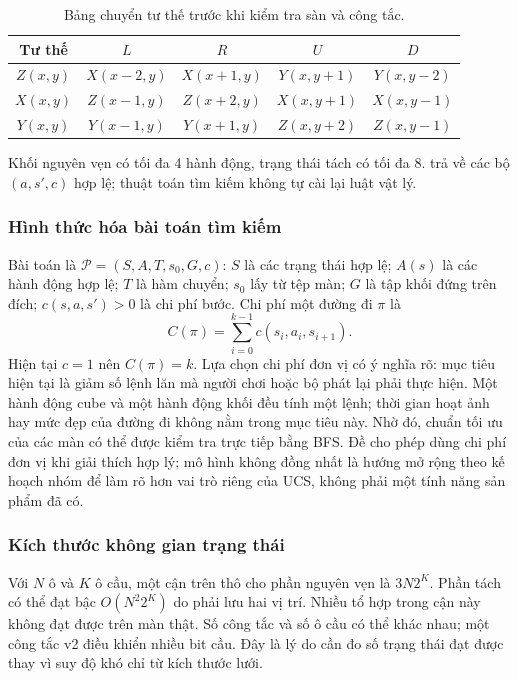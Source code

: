 \documentclass[a4paper]{article}
\newcommand{\tep}[1]{{\small\ttfamily\detokenize{#1}}}
\begin{document}
\begin{table}[H]\centering\small
\begin{tabular}{@{}c c c c c@{}}\toprule
\textbf{Tư thế} & $L$ & $R$ & $U$ & $D$\\\midrule
$Z(x,y)$ & $X(x-2,y)$ & $X(x+1,y)$ & $Y(x,y+1)$ & $Y(x,y-2)$\\
$X(x,y)$ & $Z(x-1,y)$ & $Z(x+2,y)$ & $X(x,y+1)$ & $X(x,y-1)$\\
$Y(x,y)$ & $Y(x-1,y)$ & $Y(x+1,y)$ & $Z(x,y+2)$ & $Z(x,y-1)$\\\bottomrule
\end{tabular}
\caption{Bảng chuyển tư thế trước khi kiểm tra sàn và công tắc.}
\end{table}

Khối nguyên vẹn có tối đa 4 hành động, trạng thái tách có tối đa 8. \tep{successors(state)} trả về các bộ $(a,s',c)$ hợp lệ; thuật toán tìm kiếm không tự cài lại luật vật lý.

\subsubsection{Hình thức hóa bài toán tìm kiếm}
Bài toán là $\mathcal{P}=(S,A,T,s_0,G,c)$: $S$ là các trạng thái hợp lệ; $A(s)$ là các hành động hợp lệ; $T$ là hàm chuyển; $s_0$ lấy từ tệp màn; $G$ là tập khối đứng trên đích; $c(s,a,s')>0$ là chi phí bước. Chi phí một đường đi $\pi$ là
\begin{equation}
C(\pi)=\sum_{i=0}^{k-1}c(s_i,a_i,s_{i+1}).
\end{equation}
Hiện tại $c=1$ nên $C(\pi)=k$.
Lựa chọn chi phí đơn vị có ý nghĩa rõ: mục tiêu hiện tại là giảm số lệnh lăn mà người chơi hoặc bộ phát lại phải thực hiện. Một hành động cube và một hành động khối đều tính một lệnh; thời gian hoạt ảnh hay mức đẹp của đường đi không nằm trong mục tiêu này. Nhờ đó, chuẩn tối ưu của các màn có thể được kiểm tra trực tiếp bằng BFS. Đề cho phép dùng chi phí đơn vị khi giải thích hợp lý; mô hình không đồng nhất là hướng mở rộng theo kế hoạch nhóm để làm rõ hơn vai trò riêng của UCS, không phải một tính năng sản phẩm đã có.

\subsubsection{Kích thước không gian trạng thái}
Với $N$ ô và $K$ ô cầu, một cận trên thô cho phần nguyên vẹn là $3N2^K$. Phần tách có thể đạt bậc $O(N^2 2^K)$ do phải lưu hai vị trí. Nhiều tổ hợp trong cận này không đạt được trên màn thật. Số công tắc và số ô cầu có thể khác nhau; một công tắc v2 điều khiển nhiều bit cầu. Đây là lý do cần đo số trạng thái đạt được thay vì suy độ khó chỉ từ kích thước lưới.
\end{document}
